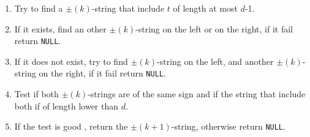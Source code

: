 \begin{itemize}
\begin{enumerate}
                    \begin{enumerate}
                        \item \label{alg:step3:1} Try to find a $\pm(k)$-string that include $t$ of length at most $d$-1.
                        \item \label{alg:step3:2} If it exists, find an other $\pm(k)$-string on the left or on the right, if it fail return \texttt{NULL}.
                        \item \label{alg:step3:3} If it does not exist, try to find $\pm(k)$-string on the left, and another $\pm(k)$-string on the right, if it fail return \texttt{NULL}.
                        \item \label{alg:step3:4} Test if both $\pm(k)$-strings are of the same sign and if the string that include both if of length lower than $d$.
                        \item \label{alg:step3:5} If the test is good , return the $\pm(k+1)$-string, otherwise return \texttt{NULL}.
                    \end{enumerate}
          \end{enumerate}


\end{itemize}
